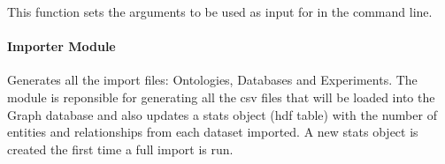\documentclass[letterpaper,10pt,english]{sphinxmanual}
\begin{document}

\begin{fulllineitems}
\label{\detokenize{_autosummary/graphdb_builder.builder:graphdb_builder.builder.create_user.set_arguments}}
This function sets the arguments to be used as input for  in the command line.

\end{fulllineitems}



\paragraph{Importer Module}
\label{\detokenize{_autosummary/graphdb_builder.builder:module-graphdb_builder.builder.importer}}\label{\detokenize{_autosummary/graphdb_builder.builder:importer-module}}
Generates all the import files: Ontologies, Databases and Experiments.
The module is reponsible for generating all the csv files that will
be loaded into the Graph database and also updates a stats object
(hdf table) with the number of entities and relationships from each
dataset imported. A new stats object is created the first time a
full import is run.
\end{document}
